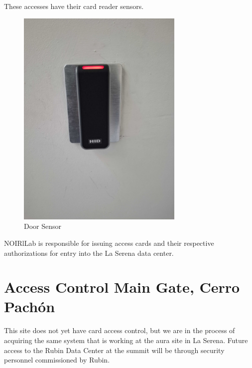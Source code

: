   \newpage

These accesses have their card reader sensors.

\begin{figure}
    \includegraphics[width=8cm]{19.jpg}
    \centering
    \caption*{Door Sensor}
  \end{figure}

NOIRlLab is responsible for issuing access cards and their respective authorizations for entry into the La Serena data center.

\section{Access Control Main Gate, Cerro Pachón}

This site does not yet have card access control, but we are in the process of acquiring the same system that is working at the aura site in La Serena.
Future access to the Rubin Data Center at the summit will be through security personnel commissioned by Rubin.

